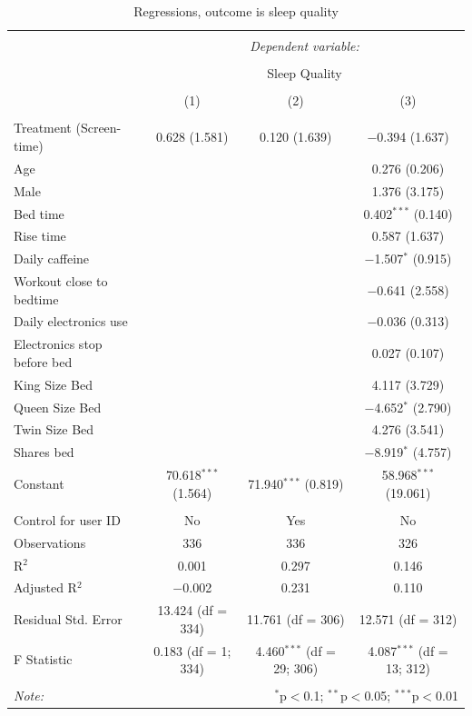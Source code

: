 \documentclass[12pt,]{article}
\begin{document}
\begin{table}[!htbp] \centering 
  \caption{\label{tab:quality_regressions} Regressions, outcome is sleep quality} 
  \label{} 
\begin{tabular}{@{\extracolsep{5pt}}lccc} 
\\[-1.8ex]\hline 
\hline \\[-1.8ex] 
 & \multicolumn{3}{c}{\textit{Dependent variable:}} \\ 
\cline{2-4} 
\\[-1.8ex] & \multicolumn{3}{c}{Sleep Quality} \\ 
\\[-1.8ex] & (1) & (2) & (3)\\ 
\hline \\[-1.8ex] 
 Treatment (Screen-time) & 0.628 (1.581) & 0.120 (1.639) & $-$0.394 (1.637) \\ 
  Age &  &  & 0.276 (0.206) \\ 
  Male &  &  & 1.376 (3.175) \\ 
  Bed time &  &  & 0.402$^{***}$ (0.140) \\ 
  Rise time &  &  & 0.587 (1.637) \\ 
  Daily caffeine &  &  & $-$1.507$^{*}$ (0.915) \\ 
  Workout close to bedtime &  &  & $-$0.641 (2.558) \\ 
  Daily electronics use &  &  & $-$0.036 (0.313) \\ 
  Electronics stop before bed &  &  & 0.027 (0.107) \\ 
  King Size Bed &  &  & 4.117 (3.729) \\ 
  Queen Size Bed &  &  & $-$4.652$^{*}$ (2.790) \\ 
  Twin Size Bed &  &  & 4.276 (3.541) \\ 
  Shares bed &  &  & $-$8.919$^{*}$ (4.757) \\ 
  Constant & 70.618$^{***}$ (1.564) & 71.940$^{***}$ (0.819) & 58.968$^{***}$ (19.061) \\ 
 \hline \\[-1.8ex] 
Control for user ID & No & Yes & No \\ 
Observations & 336 & 336 & 326 \\ 
R$^{2}$ & 0.001 & 0.297 & 0.146 \\ 
Adjusted R$^{2}$ & $-$0.002 & 0.231 & 0.110 \\ 
Residual Std. Error & 13.424 (df = 334) & 11.761 (df = 306) & 12.571 (df = 312) \\ 
F Statistic & 0.183 (df = 1; 334) & 4.460$^{***}$ (df = 29; 306) & 4.087$^{***}$ (df = 13; 312) \\ 
\hline 
\hline \\[-1.8ex] 
\textit{Note:}  & \multicolumn{3}{r}{$^{*}$p$<$0.1; $^{**}$p$<$0.05; $^{***}$p$<$0.01} \\ 
\end{tabular} 
\end{table}
\end{document}
